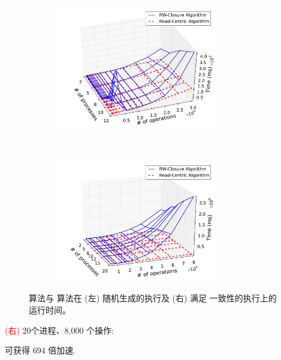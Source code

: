 \begin{frame}{}
  \begin{figure}[t]
    \centering
    \begin{subfigure}[t]{0.50\textwidth}
      \includegraphics[width = 0.80\textwidth]{figs/vpc-random-cmp.pdf}
    \end{subfigure}%
    ~
    \begin{subfigure}[t]{0.50\textwidth}
      \includegraphics[width = 0.80\textwidth]{figs/vpc-valid-cmp.pdf}
    \end{subfigure}
    \caption{\rwclosure{} 算法与 \readcentric{} 算法在
    \textcolor{blue!80}{ (左) 随机生成}的执行及
    \textcolor{red!80}{ (右) 满足 \PRAM{} 一致性}的执行上的运行时间。}
  \end{figure}

  \pause
  \begin{center}
    \textcolor{red}{(右)} 20个进程、8,000 个操作: 

    \readcentric{} 可获得 694 倍加速.
  \end{center}
\end{frame}

